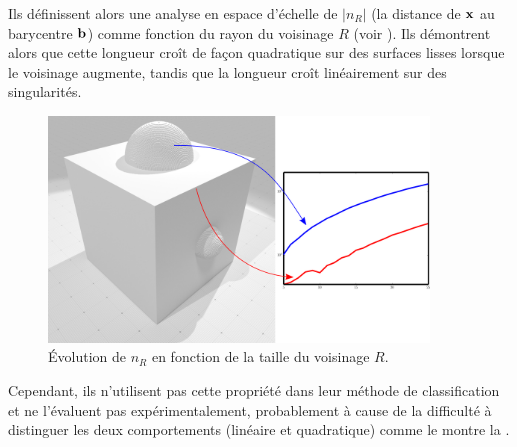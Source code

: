 Ils définissent alors une analyse en espace d'échelle de $|n_R|$ (la distance de
$\mathbf{x}$ au barycentre $\mathbf{b}$) comme fonction du rayon du voisinage $R$ (voir
). Ils démontrent alors que cette longueur
croît de façon quadratique sur des surfaces lisses lorsque le voisinage
augmente, tandis que la longueur croît linéairement sur des singularités.
%
\begin{figure}[ht]{
    \begin{center}
    \includegraphics[height=6cm]{figures/CubeSpherePlotMoment_SS}
    \end{center}}
    \caption[Évolution de $n_R$ en fonction de la taille du voisinage $R$]{Évolution de $n_R$ en fonction de la taille du voisinage $R$.
      \label{fig:moment-multiscale}}
\end{figure}
%
Cependant, ils n'utilisent pas cette propriété dans leur méthode de
classification et ne l'évaluent pas expérimentalement, probablement à cause de
la difficulté à distinguer les deux comportements (linéaire et quadratique)
comme le montre la .



